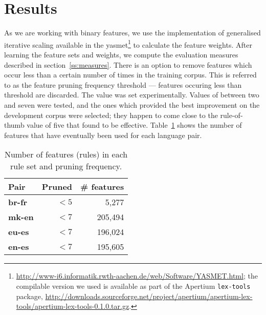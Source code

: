 \documentclass[11pt]{article}
\begin{document}
\section{Results}
\label{sec:eval-ref-results}

As we are working with binary features, we use the implementation of
generalised iterative scaling available in the {\sc
  yasmet}\footnote{\url{http://www-i6.informatik.rwth-aachen.de/web/Software/YASMET.html};
  the compilable version we used is available as part of the Apertium
  \texttt{lex-tools} package,
  \url{http://downloads.sourceforge.net/project/apertium/apertium-lex-tools/apertium-lex-tools-0.1.0.tar.gz}.}
to calculate the feature weights.  After learning the feature sets and
weights, we compute the evaluation measures described in
section~\ref{ss:measures}. There is an option to remove features which
occur less than a certain number of times in the training corpus. This
is referred to as the feature pruning frequency threshold --- features
occuring less than threshold are discarded. The value was set
experimentally. Values of between two and seven were tested, and the
ones which provided the best improvement on the development corpus
were selected; they happen to come close to the rule-of-thumb value of
five that \citet[p.~596]{Manning99b} found to be effective.
Table~\ref{table:maxent-features} shows the number of features that
have eventually been used for each language pair.


\begin{table}
 \begin{center}
    \begin{tabular}{|l|r|r|}
        \hline
        \textbf{Pair} & \textbf{Pruned} & \textbf{\# features} \\\hline
        \hline
        {\bf br-fr}  & $< 5$              & 5,277    \\ 
        \hline
        {\bf mk-en} & $< 7$              & 205,494 \\ 
        \hline
        {\bf eu-es} & $< 7$              & 196,024\\
        \hline
        {\bf en-es} & $< 7$              & 195,605\\
        \hline
    \end{tabular}
 \end{center}
 \caption{Number of features (rules) in each rule set and pruning frequency.}
 \label{table:maxent-features}
\end{table}
\end{document}
